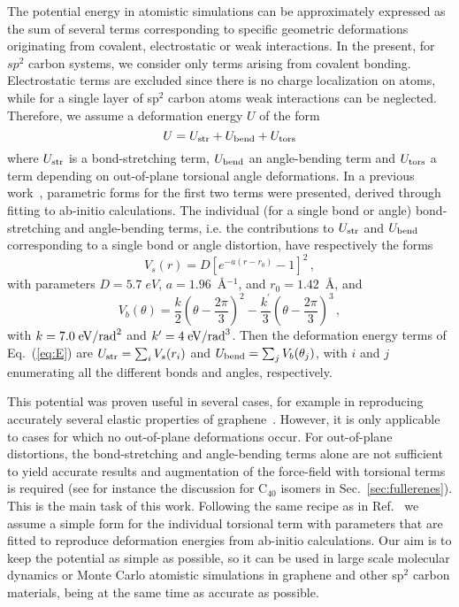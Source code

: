 \documentclass[aps,prb,floatfix,twocolumn,showpacs]{revtex4}
\begin{document}
The potential energy in atomistic simulations can be approximately expressed as the sum of several 
terms corresponding to specific geometric deformations originating from covalent,  electrostatic
or weak interactions. In the present, for $sp^2$ carbon systems, we consider only terms arising from covalent bonding.
Electrostatic terms are excluded since there is no charge localization on atoms, while for a single 
layer of sp$^2$ carbon atoms weak interactions can be neglected.
Therefore, we assume a deformation energy $U$ of the form
\begin{equation}
\label{eq:E}
 U=U_{\rm str} + U_{\rm bend} + U_{\rm tors}
\end{equation}
where $U_{\rm str}$ is a bond-stretching term, $U_{\rm bend}$ an angle-bending term and 
$U_{\rm tors}$ a term depending on out-of-plane torsional angle deformations. 
In a previous work~\cite{kalosakas},  parametric forms for the first two terms were presented,
derived through fitting to ab-initio calculations. The individual (for a single bond or angle)
bond-stretching and angle-bending terms, i.e. the contributions to $U_{\rm str}$ and
$U_{\rm bend}$ corresponding to a single bond or angle distortion, 
have respectively the forms~\cite{kalosakas}
\begin{equation}  \label{bsp}
V_s(r) = D \left[ e^{-a(r-r_0)}-1 \right]^2\,,
\end{equation}
with parameters $D=5.7 \; eV$, $a=1.96$~\AA$^{-1}$, and $r_0=1.42$~\AA, and
\begin{equation}  \label{abp}
V_b(\theta) = \frac{k}{2} \left( \theta-\frac{2\pi}{3} \right)^2 - \frac{k^\prime}{3} \left( \theta-\frac{2\pi}{3} \right)^3\,,
\end{equation}
with $k=7.0 \; {\rm eV}/{\rm rad}^2$ and $k^\prime=4 \; {\rm eV}/{\rm rad}^3$. Then the deformation energy terms of Eq.~(\ref{eq:E}) 
are $U_{\rm str} = \sum_i V_s(r_i)$ and $U_{\rm bend}=\sum_j V_b(\theta_j)$,
with $i$ and $j$ enumerating all the different bonds and angles, respectively.

This potential was proven useful in several cases, for example 
in reproducing accurately several elastic properties of graphene~\cite{kalosakas}.
However, it is only applicable to cases for which no out-of-plane deformations occur. 
For out-of-plane distortions, the bond-stretching and angle-bending terms alone are 
not sufficient to yield accurate results and augmentation of the force-field with
torsional terms is required (see for instance the discussion for C$_{40}$ isomers in 
Sec.~\ref{sec:fullerenes}). This is the main task of this work. Following the same recipe 
as in Ref.~ we assume a simple form for the individual torsional term
with parameters that are fitted to reproduce deformation energies from ab-initio calculations.
Our aim is to keep the potential as simple as possible, so it can be used in large scale molecular dynamics
or Monte Carlo atomistic simulations in graphene and other sp$^2$ carbon
materials, being at the same time as accurate as possible.
\end{document}
